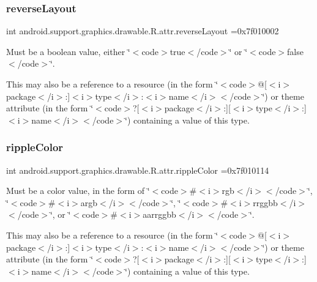 \subsubsection{\texorpdfstring{reverse\+Layout}{reverseLayout}}
{\footnotesize\ttfamily int android.\+support.\+graphics.\+drawable.\+R.\+attr.\+reverse\+Layout =0x7f010002\hspace{0.3cm}{\ttfamily [static]}}

Must be a boolean value, either \char`\"{}$<$code$>$true$<$/code$>$\char`\"{} or \char`\"{}$<$code$>$false$<$/code$>$\char`\"{}. 

This may also be a reference to a resource (in the form \char`\"{}$<$code$>$@\mbox{[}$<$i$>$package$<$/i$>$\+:\mbox{]}$<$i$>$type$<$/i$>$\+:$<$i$>$name$<$/i$>$$<$/code$>$\char`\"{}) or theme attribute (in the form \char`\"{}$<$code$>$?\mbox{[}$<$i$>$package$<$/i$>$\+:\mbox{]}\mbox{[}$<$i$>$type$<$/i$>$\+:\mbox{]}$<$i$>$name$<$/i$>$$<$/code$>$\char`\"{}) containing a value of this type. \mbox{\label{classandroid_1_1support_1_1graphics_1_1drawable_1_1R_1_1attr_a44a4ce730ff71c98d987d3fc4f964afe}} 
\subsubsection{\texorpdfstring{ripple\+Color}{rippleColor}}
{\footnotesize\ttfamily int android.\+support.\+graphics.\+drawable.\+R.\+attr.\+ripple\+Color =0x7f010114\hspace{0.3cm}{\ttfamily [static]}}

Must be a color value, in the form of \char`\"{}$<$code$>$\#$<$i$>$rgb$<$/i$>$$<$/code$>$\char`\"{}, \char`\"{}$<$code$>$\#$<$i$>$argb$<$/i$>$$<$/code$>$\char`\"{}, \char`\"{}$<$code$>$\#$<$i$>$rrggbb$<$/i$>$$<$/code$>$\char`\"{}, or \char`\"{}$<$code$>$\#$<$i$>$aarrggbb$<$/i$>$$<$/code$>$\char`\"{}. 

This may also be a reference to a resource (in the form \char`\"{}$<$code$>$@\mbox{[}$<$i$>$package$<$/i$>$\+:\mbox{]}$<$i$>$type$<$/i$>$\+:$<$i$>$name$<$/i$>$$<$/code$>$\char`\"{}) or theme attribute (in the form \char`\"{}$<$code$>$?\mbox{[}$<$i$>$package$<$/i$>$\+:\mbox{]}\mbox{[}$<$i$>$type$<$/i$>$\+:\mbox{]}$<$i$>$name$<$/i$>$$<$/code$>$\char`\"{}) containing a value of this type. \mbox{\label{classandroid_1_1support_1_1graphics_1_1drawable_1_1R_1_1attr_aa60143156f95fecfd422c4368f22fd0c}} 
